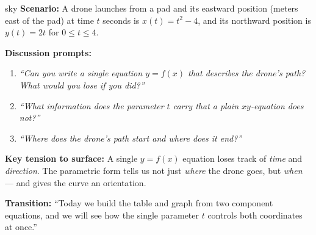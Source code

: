 \documentclass[10pt]{article}
\begin{document}
\vspace{0.08in}

\begin{skillbox}{sky}
\textbf{Scenario:} A drone launches from a pad and its eastward position
(meters east of the pad) at time $t$ seconds is $x(t) = t^2 - 4$, and
its northward position is $y(t) = 2t$ for $0 \le t \le 4$.

\textbf{Discussion prompts:}
\begin{enumerate}[leftmargin=1.4em, itemsep=3pt]
  \item \textit{``Can you write a single equation $y = f(x)$ that
    describes the drone's path? What would you lose if you did?''}
  \item \textit{``What information does the parameter $t$ carry that a
    plain $xy$-equation does not?''}
  \item \textit{``Where does the drone's path start and where does it
    end?''}
\end{enumerate}

\textbf{Key tension to surface:} A single $y = f(x)$ equation loses
track of \emph{time} and \emph{direction}. The parametric form tells us
not just \emph{where} the drone goes, but \emph{when} --- and gives the
curve an orientation.

\textbf{Transition:} ``Today we build the table and graph from two
component equations, and we will see how the single parameter $t$
controls both coordinates at once.''
\end{skillbox}

\vspace{0.08in}
\end{document}
